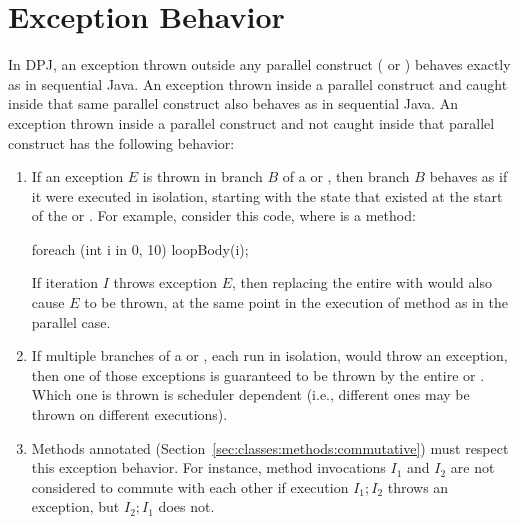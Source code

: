 \section{Exception Behavior%
\label{sec:exceptions}}

In DPJ, an exception thrown outside any parallel construct
( or ) behaves exactly as in sequential
Java.  An exception thrown inside a parallel construct and caught
inside that same parallel construct also behaves as in sequential
Java.  An exception thrown inside a parallel construct and not caught
inside that parallel construct has the following behavior:

\begin{enumerate}
\item If an exception $E$ is thrown in branch $B$ of a 
  or , then branch $B$ behaves as if it were executed in
  isolation, starting with the state that existed at the start of the
   or .  For example, consider this code,
  where  is a method:

\begin{dpjlisting}
foreach (int i in 0, 10) {
    loopBody(i);
}
\end{dpjlisting}

If iteration $I$ throws exception $E$, then replacing the entire
 with  would also cause $E$ to be
thrown, at the same point in the execution of method  as
in the parallel case.

\item If multiple branches of a  or , each
  run in isolation, would throw an exception, then one of those
  exceptions is guaranteed to be thrown by the entire  or
  .  Which one is thrown is scheduler dependent (i.e.,
  different ones may be thrown on different executions).

\item Methods annotated 
  (Section~\ref{sec:classes:methods:commutative}) must respect this
  exception behavior.  For instance, method invocations $I_1$ and
  $I_2$ are not considered to commute with each other if execution
  $I_1; I_2$ throws an exception, but $I_2; I_1$ does not.

\end{enumerate}
